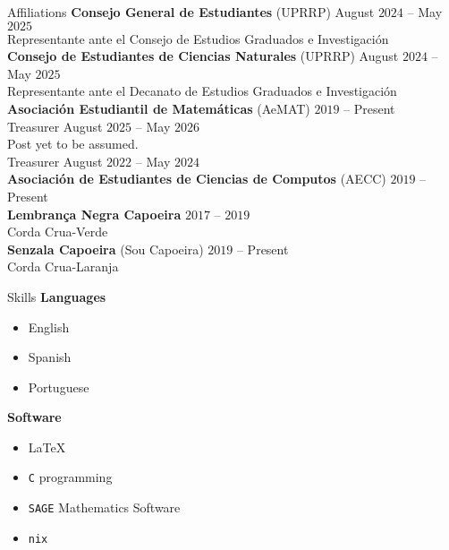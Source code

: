 \documentclass{resume}
\begin{document}
\begin{rSection}{Affiliations}
  \textbf{Consejo General de Estudiantes} (UPRRP)
            \hfill August $2024$ -- May $2025$  \\
  Representante ante el Consejo de Estudios Graduados e
  Investigaci\'on \\

  \textbf{Consejo de Estudiantes de Ciencias Naturales} (UPRRP)
            \hfill August $2024$ -- May $2025$  \\
  Representante ante el Decanato de Estudios Graduados e
  Investigaci\'on \\

  \textbf{Asociaci\'on Estudiantil de Matem\'aticas} (AeMAT)
            \hfill $2019$ -- Present \medskip \\
    Treasurer \hfill August $2025$ -- May $2026$ \\
    {\footnotesize Post yet to be assumed}.  \medskip \\
    Treasurer \hfill August $2022$ -- May $2024$ \\

  \textbf{Asociaci\'on de Estudiantes de Ciencias de Computos} (AECC)
            \hfill $2019$ --  Present \\

  \textbf{Lembran\c{c}a Negra Capoeira} \hfill $2017$ -- $2019$ \\
  Corda Crua-Verde  \\

  \textbf{Senzala Capoeira} (Sou Capoeira) \hfill $2019$ -- Present \\
  Corda Crua-Laranja  \\
\end{rSection}

\begin{rSection}{Skills}
  \textbf{Languages}
  \begin{itemize}
    \item[] English

    \item[] Spanish

    \item[] Portuguese
  \end{itemize}

  \textbf{Software}
  \begin{itemize}
    \item[] \LaTeX

    \item[] \lstinline{C} programming

    \item[] \lstinline{SAGE} Mathematics Software

    \item[] \lstinline{nix}
  \end{itemize}
\end{rSection}
\end{document}
